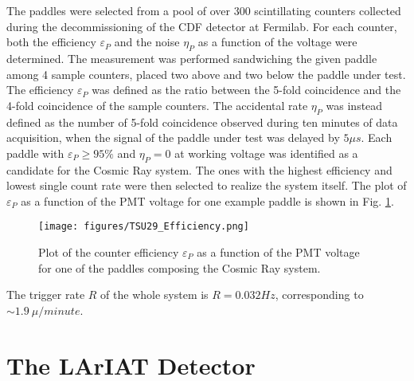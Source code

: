 The paddles were selected from a pool of over 300 scintillating counters collected during the decommissioning of the CDF detector at Fermilab. 
For each counter, both the efficiency $\varepsilon_P$ and the noise $\eta_P$ as a function of the voltage were determined. The measurement was performed sandwiching the given paddle among 4 sample counters, placed two above and two below the paddle under test. The efficiency 
$\varepsilon_P$ was defined as the ratio between the 5-fold coincidence and the 4-fold coincidence of the sample counters. The accidental rate $\eta_P$ was instead defined as the number of 5-fold coincidence observed during ten minutes of data acquisition, when the signal of the paddle under test was delayed by $5 \mu s$. Each paddle with $\varepsilon_P \geq 95\%$ and $\eta_P = 0$ at working voltage was identified as a candidate for the Cosmic Ray system. The ones with the highest efficiency and lowest single count rate were then selected to realize the system itself. 
The plot of $\varepsilon_P$ as a function of the PMT voltage for one example paddle is shown in Fig. \ref{pic:CR_Effplot}.

\begin{figure}[h!]
 \centering
 \texttt{[image: figures/TSU29\_Efficiency.png]}
\caption{
Plot of the counter efficiency $\varepsilon_P$ as a function of the PMT voltage for one of the paddles composing the Cosmic Ray system. 
} 
\label{pic:CR_Effplot}
\end{figure}








The trigger rate $R$ of the whole system is $R=0.032Hz$, corresponding to $\sim 1.9~\mu/minute$.



\section{The LArIAT Detector}\label{sec:LArIATDetector}


